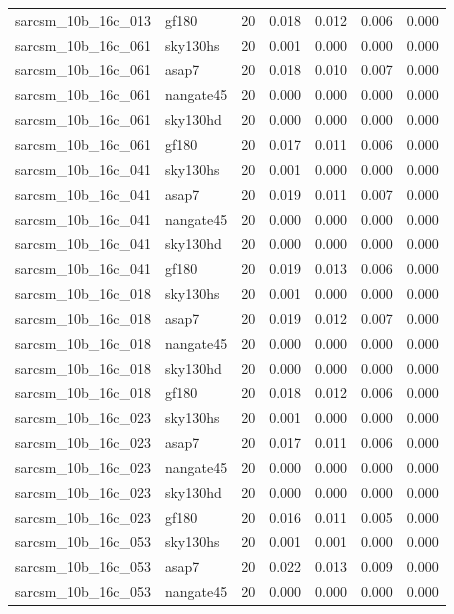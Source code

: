 \begin{tabular}{llrrrrr}
sarcsm\_10b\_16c\_013 & gf180 & 20 & 0.018 & 0.012 & 0.006 & 0.000 \\
sarcsm\_10b\_16c\_061 & sky130hs & 20 & 0.001 & 0.000 & 0.000 & 0.000 \\
sarcsm\_10b\_16c\_061 & asap7 & 20 & 0.018 & 0.010 & 0.007 & 0.000 \\
sarcsm\_10b\_16c\_061 & nangate45 & 20 & 0.000 & 0.000 & 0.000 & 0.000 \\
sarcsm\_10b\_16c\_061 & sky130hd & 20 & 0.000 & 0.000 & 0.000 & 0.000 \\
sarcsm\_10b\_16c\_061 & gf180 & 20 & 0.017 & 0.011 & 0.006 & 0.000 \\
sarcsm\_10b\_16c\_041 & sky130hs & 20 & 0.001 & 0.000 & 0.000 & 0.000 \\
sarcsm\_10b\_16c\_041 & asap7 & 20 & 0.019 & 0.011 & 0.007 & 0.000 \\
sarcsm\_10b\_16c\_041 & nangate45 & 20 & 0.000 & 0.000 & 0.000 & 0.000 \\
sarcsm\_10b\_16c\_041 & sky130hd & 20 & 0.000 & 0.000 & 0.000 & 0.000 \\
sarcsm\_10b\_16c\_041 & gf180 & 20 & 0.019 & 0.013 & 0.006 & 0.000 \\
sarcsm\_10b\_16c\_018 & sky130hs & 20 & 0.001 & 0.000 & 0.000 & 0.000 \\
sarcsm\_10b\_16c\_018 & asap7 & 20 & 0.019 & 0.012 & 0.007 & 0.000 \\
sarcsm\_10b\_16c\_018 & nangate45 & 20 & 0.000 & 0.000 & 0.000 & 0.000 \\
sarcsm\_10b\_16c\_018 & sky130hd & 20 & 0.000 & 0.000 & 0.000 & 0.000 \\
sarcsm\_10b\_16c\_018 & gf180 & 20 & 0.018 & 0.012 & 0.006 & 0.000 \\
sarcsm\_10b\_16c\_023 & sky130hs & 20 & 0.001 & 0.000 & 0.000 & 0.000 \\
sarcsm\_10b\_16c\_023 & asap7 & 20 & 0.017 & 0.011 & 0.006 & 0.000 \\
sarcsm\_10b\_16c\_023 & nangate45 & 20 & 0.000 & 0.000 & 0.000 & 0.000 \\
sarcsm\_10b\_16c\_023 & sky130hd & 20 & 0.000 & 0.000 & 0.000 & 0.000 \\
sarcsm\_10b\_16c\_023 & gf180 & 20 & 0.016 & 0.011 & 0.005 & 0.000 \\
sarcsm\_10b\_16c\_053 & sky130hs & 20 & 0.001 & 0.001 & 0.000 & 0.000 \\
sarcsm\_10b\_16c\_053 & asap7 & 20 & 0.022 & 0.013 & 0.009 & 0.000 \\
sarcsm\_10b\_16c\_053 & nangate45 & 20 & 0.000 & 0.000 & 0.000 & 0.000 \\

\end{tabular}
